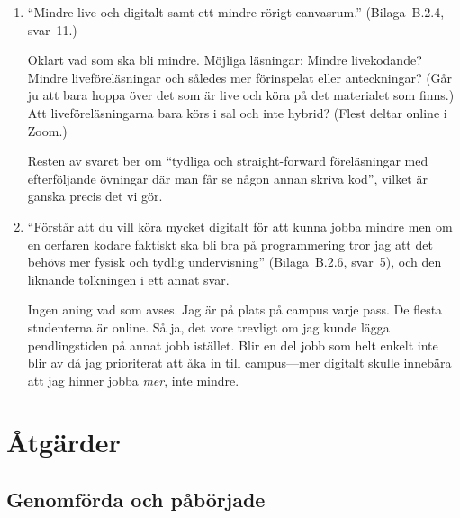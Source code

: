 \documentclass[a4paper]{article}
\begin{document}
\begin{refsection}
\begin{enumerate}
  Det är väl vad vi gör på föreläsningarna? Möjliga läsningar: studenten
  har varit på få pass (\enquote{ett fåtal}) och träffat dem där
  diskussionen kring en pröva-först-fråga tog tiden; eller de få 
  föreläsningarna i början av kursen som använde slides.
\item \enquote{Mindre live och digitalt samt ett mindre rörigt
  canvasrum.} (Bilaga~B.2.4, svar~11.)

  Oklart vad som ska bli mindre.
  Möjliga läsningar:
  Mindre livekodande? Mindre liveföreläsningar och således mer förinspelat 
  eller anteckningar? (Går ju att bara hoppa över det som är live och köra på 
  det materialet som finns.)
  Att liveföreläsningarna bara körs i sal och inte hybrid? (Flest deltar online 
  i Zoom.)

  Resten av svaret ber om \enquote{tydliga och straight-forward föreläsningar
  med efterföljande övningar där man får se någon annan skriva kod}, vilket är 
  ganska precis det vi gör.
\item \enquote{Förstår att du vill köra mycket digitalt för att kunna
  jobba mindre men om en oerfaren kodare faktiskt ska bli bra på
  programmering tror jag att det behövs mer fysisk och tydlig
  undervisning} (Bilaga~B.2.6, svar~5), och den liknande tolkningen i
  ett annat svar.

  Ingen aning vad som avses.
  Jag är på plats på campus varje pass.
  De flesta studenterna är online.
  Så ja, det vore trevligt om jag kunde lägga pendlingstiden på annat jobb 
  istället.
  Blir en del jobb som helt enkelt inte blir av då jag prioriterat att åka in 
  till campus---mer digitalt skulle innebära att jag hinner jobba \emph{mer}, 
  inte mindre.
\end{enumerate}

\section{Åtgärder}

\subsection{Genomförda och påbörjade}


\end{refsection}
\end{document}
